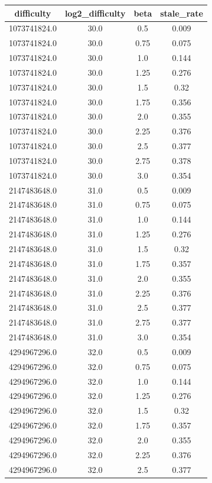 \begin{tabular}{|c|c|c|c|}
\hline
difficulty & log2\_difficulty & beta & stale\_rate \\ 
\hline
1073741824.0 & 30.0 & 0.5 & 0.009 \\ 
1073741824.0 & 30.0 & 0.75 & 0.075 \\ 
1073741824.0 & 30.0 & 1.0 & 0.144 \\ 
1073741824.0 & 30.0 & 1.25 & 0.276 \\ 
1073741824.0 & 30.0 & 1.5 & 0.32 \\ 
1073741824.0 & 30.0 & 1.75 & 0.356 \\ 
1073741824.0 & 30.0 & 2.0 & 0.355 \\ 
1073741824.0 & 30.0 & 2.25 & 0.376 \\ 
1073741824.0 & 30.0 & 2.5 & 0.377 \\ 
1073741824.0 & 30.0 & 2.75 & 0.378 \\ 
1073741824.0 & 30.0 & 3.0 & 0.354 \\ 
2147483648.0 & 31.0 & 0.5 & 0.009 \\ 
2147483648.0 & 31.0 & 0.75 & 0.075 \\ 
2147483648.0 & 31.0 & 1.0 & 0.144 \\ 
2147483648.0 & 31.0 & 1.25 & 0.276 \\ 
2147483648.0 & 31.0 & 1.5 & 0.32 \\ 
2147483648.0 & 31.0 & 1.75 & 0.357 \\ 
2147483648.0 & 31.0 & 2.0 & 0.355 \\ 
2147483648.0 & 31.0 & 2.25 & 0.376 \\ 
2147483648.0 & 31.0 & 2.5 & 0.377 \\ 
2147483648.0 & 31.0 & 2.75 & 0.377 \\ 
2147483648.0 & 31.0 & 3.0 & 0.354 \\ 
4294967296.0 & 32.0 & 0.5 & 0.009 \\ 
4294967296.0 & 32.0 & 0.75 & 0.075 \\ 
4294967296.0 & 32.0 & 1.0 & 0.144 \\ 
4294967296.0 & 32.0 & 1.25 & 0.276 \\ 
4294967296.0 & 32.0 & 1.5 & 0.32 \\ 
4294967296.0 & 32.0 & 1.75 & 0.357 \\ 
4294967296.0 & 32.0 & 2.0 & 0.355 \\ 
4294967296.0 & 32.0 & 2.25 & 0.376 \\ 
4294967296.0 & 32.0 & 2.5 & 0.377 \\ 

\end{tabular}
